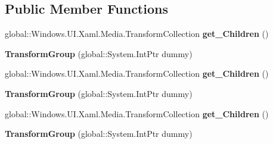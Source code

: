 \subsection*{Public Member Functions}
\begin{DoxyCompactItemize}
\item 
\mbox{\label{class_windows_1_1_u_i_1_1_xaml_1_1_media_1_1_transform_group_ac0e4bc5659ceface6cd1574a3b969d17}} 
global\+::\+Windows.\+U\+I.\+Xaml.\+Media.\+Transform\+Collection {\bfseries get\+\_\+\+Children} ()
\item 
\mbox{\label{class_windows_1_1_u_i_1_1_xaml_1_1_media_1_1_transform_group_a79af706bb0944f29556aa089b751c0f2}} 
{\bfseries Transform\+Group} (global\+::\+System.\+Int\+Ptr dummy)
\item 
\mbox{\label{class_windows_1_1_u_i_1_1_xaml_1_1_media_1_1_transform_group_ac0e4bc5659ceface6cd1574a3b969d17}} 
global\+::\+Windows.\+U\+I.\+Xaml.\+Media.\+Transform\+Collection {\bfseries get\+\_\+\+Children} ()
\item 
\mbox{\label{class_windows_1_1_u_i_1_1_xaml_1_1_media_1_1_transform_group_a79af706bb0944f29556aa089b751c0f2}} 
{\bfseries Transform\+Group} (global\+::\+System.\+Int\+Ptr dummy)
\item 
\mbox{\label{class_windows_1_1_u_i_1_1_xaml_1_1_media_1_1_transform_group_ac0e4bc5659ceface6cd1574a3b969d17}} 
global\+::\+Windows.\+U\+I.\+Xaml.\+Media.\+Transform\+Collection {\bfseries get\+\_\+\+Children} ()
\item 
\mbox{\label{class_windows_1_1_u_i_1_1_xaml_1_1_media_1_1_transform_group_a79af706bb0944f29556aa089b751c0f2}} 
{\bfseries Transform\+Group} (global\+::\+System.\+Int\+Ptr dummy)
\item 
\mbox{\label{class_windows_1_1_u_i_1_1_xaml_1_1_media_1_1_transform_group_ac0e4bc5659ceface6cd1574a3b969d17}} 

\end{DoxyCompactItemize}
